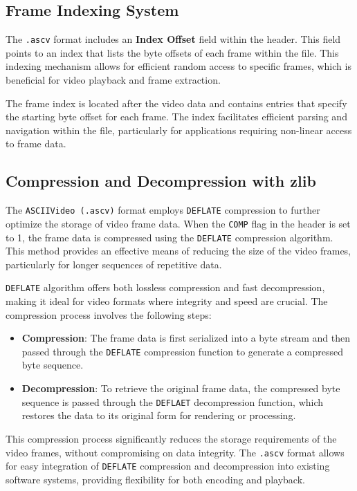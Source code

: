 \documentclass{article}
\begin{document}
\subsection{Frame Indexing System}

The \texttt{.ascv} format includes an \textbf{Index Offset} \cite{enwiki:1242251239} field within the header. This field points to an index that lists the byte offsets of each frame within the file. This indexing mechanism allows for efficient random access to specific frames, which is beneficial for video playback and frame extraction.

The frame index is located after the video data and contains entries that specify the starting byte offset for each frame. The index facilitates efficient parsing and navigation within the file, particularly for applications requiring non-linear access to frame data.

\subsection{Compression and Decompression with zlib}

The \texttt{ASCIIVideo (.ascv)} format employs \texttt{DEFLATE} \cite{rfc1951} compression to further optimize the storage of video frame data. When the \texttt{COMP} flag in the header is set to 1, the frame data is compressed using the \texttt{DEFLATE} compression algorithm. This method provides an effective means of reducing the size of the video frames, particularly for longer sequences of repetitive data.

\texttt{DEFLATE} algorithm offers both lossless compression and fast decompression, making it ideal for video formats where integrity and speed are crucial. The compression process involves the following steps:

\begin{itemize}
    \item \textbf{Compression}: The frame data is first serialized into a byte stream and then passed through the \texttt{DEFLATE} compression function to generate a compressed byte sequence.
    \item \textbf{Decompression}: To retrieve the original frame data, the compressed byte sequence is passed through the \texttt{DEFLAET} decompression function, which restores the data to its original form for rendering or processing.
\end{itemize}

This compression process significantly reduces the storage requirements of the video frames, without compromising on data integrity. The \texttt{.ascv} format allows for easy integration of \texttt{DEFLATE} compression and decompression into existing software systems, providing flexibility for both encoding and playback.
\end{document}
